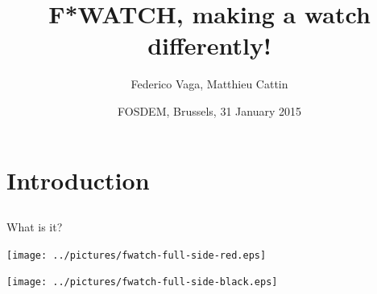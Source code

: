 \documentclass[compress,red]{beamer}
\title[{\makebox[.45\paperwidth]{F*WATCH\hfill%
       \insertframenumber/\inserttotalframenumber}}]{F*WATCH, making a watch differently!}
\author %
{Federico Vaga, Matthieu Cattin}
\date %
{FOSDEM, Brussels, 31 January 2015}
\begin{document}
\begin{frame}
  \titlepage
\end{frame}








\section{Introduction}

\subsection*{} %

\begin{frame}{What is it?}

 {
  \begin{center}
    
\texttt{[image: ../pictures/fwatch-full-side-red.eps]}
  \end{center}
} {
  \begin{center}
\texttt{[image: ../pictures/fwatch-full-side-black.eps]}
  \end{center}
}

\end{frame}
\end{document}
